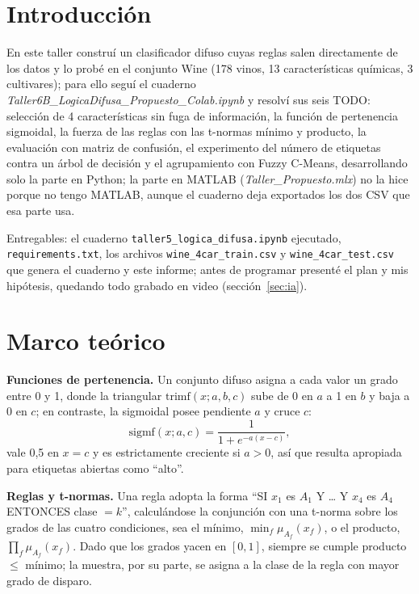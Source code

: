 \documentclass[11pt,letterpaper]{article}
\begin{document}
\UDportada

\section{Introducción}

En este taller construí un clasificador difuso cuyas reglas salen directamente de los datos y lo probé en el conjunto Wine (178 vinos, 13 características químicas, 3 cultivares); para ello seguí el cuaderno \textit{Taller6B\_LogicaDifusa\_Propuesto\_Colab.ipynb} y resolví sus seis TODO: selección de 4 características sin fuga de información, la función de pertenencia sigmoidal, la fuerza de las reglas con las t-normas mínimo y producto, la evaluación con matriz de confusión, el experimento del número de etiquetas contra un árbol de decisión y el agrupamiento con Fuzzy C-Means, desarrollando solo la parte en Python; la parte en MATLAB (\textit{Taller\_Propuesto.mlx}) no la hice porque no tengo MATLAB, aunque el cuaderno deja exportados los dos CSV que esa parte usa.

Entregables: el cuaderno \texttt{taller5\_logica\_difusa.ipynb} ejecutado, \texttt{requirements.txt}, los archivos \texttt{wine\_4car\_train.csv} y \texttt{wine\_4car\_test.csv} que genera el cuaderno y este informe; antes de programar presenté el plan y mis hipótesis, quedando todo grabado en video (sección~\ref{sec:ia}).

\section{Marco teórico}

\textbf{Funciones de pertenencia.} Un conjunto difuso asigna a cada valor un grado entre 0 y 1, donde la triangular $\mathrm{trimf}(x;a,b,c)$ sube de 0 en $a$ a 1 en $b$ y baja a 0 en $c$; en contraste, la sigmoidal posee pendiente $a$ y cruce $c$:
\begin{equation*}
\mathrm{sigmf}(x;a,c)=\frac{1}{1+e^{-a(x-c)}},
\end{equation*}
vale 0,5 en $x=c$ y es estrictamente creciente si $a>0$, así que resulta apropiada para etiquetas abiertas como ``alto''.

\textbf{Reglas y t-normas.} Una regla adopta la forma ``SI $x_1$ es $A_1$ Y \dots{} Y $x_4$ es $A_4$ ENTONCES clase $= k$'', calculándose la conjunción con una t-norma sobre los grados de las cuatro condiciones, sea el mínimo, $\min_f \mu_{A_f}(x_f)$, o el producto, $\prod_f \mu_{A_f}(x_f)$. Dado que los grados yacen en $[0,1]$, siempre se cumple producto $\le$ mínimo; la muestra, por su parte, se asigna a la clase de la regla con mayor grado de disparo.
\end{document}
